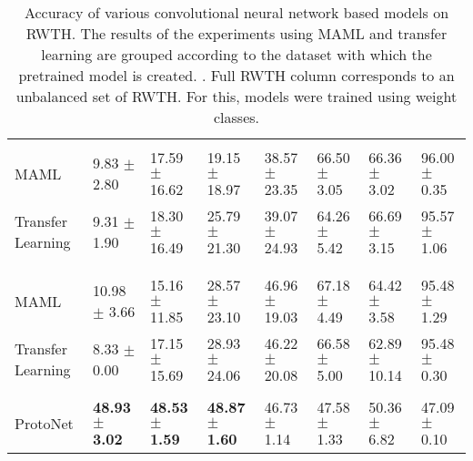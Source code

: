 \begin{table}[h!]
{{\begin{tabular}{ p{9em} p{7em} p{7em} p{7em} p{7em} p{7em} p{7em} p{7em} }
\rowcolor{black!65} \multicolumn{8}{l}{\color{white}CIARP} \\
MAML               &    9.83 $\pm$ 2.80  &   17.59 $\pm$ 16.62 &   19.15 $\pm$ 18.97 &   38.57 $\pm$ 23.35 &   66.50 $\pm$ 3.05  &   66.36 $\pm$ 3.02  &   96.00 $\pm$ 0.35   \\
Transfer Learning  &    9.31 $\pm$ 1.90  &   18.30 $\pm$ 16.49 &   25.79 $\pm$ 21.30 &   39.07 $\pm$ 24.93 &   64.26 $\pm$ 5.42  &   66.69 $\pm$ 3.15  &   95.57 $\pm$ 1.06   \\ \\

\rowcolor{black!65} \multicolumn{8}{l}{\color{white}LSA16} \\
MAML               &   10.98 $\pm$ 3.66  &   15.16 $\pm$ 11.85 &   28.57 $\pm$ 23.10 &   46.96 $\pm$ 19.03 &   67.18 $\pm$ 4.49  &   64.42 $\pm$ 3.58  &   95.48 $\pm$ 1.29   \\
Transfer Learning  &    8.33 $\pm$ 0.00  &   17.15 $\pm$ 15.69 &   28.93 $\pm$ 24.06 &   46.22 $\pm$ 20.08 &   66.58 $\pm$ 5.00  &   62.89 $\pm$ 10.14 &   95.48 $\pm$ 0.30   \\ \\

ProtoNet           &   \textbf{48.93 $\pm$ 3.02}  &   \textbf{48.53 $\pm$ 1.59}  &   \textbf{48.87 $\pm$ 1.60}  &   46.73 $\pm$ 1.14  &   47.58 $\pm$ 1.33  &   50.36 $\pm$ 6.82  &   47.09 $\pm$ 0.10   \\

\bottomrule
\end{tabular}
} %
} %
\caption{Accuracy of various convolutional neural network based models on RWTH. The results of the experiments using MAML and transfer learning are grouped according to the dataset with which the pretrained model is created. \label{tab:results:rwth}. Full RWTH column corresponds to an unbalanced set of RWTH. For this, models were trained using weight classes.}
\end{table}